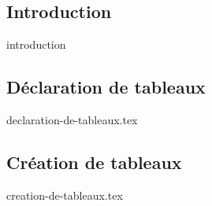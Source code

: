 \subsection{Introduction}\label{subsec:introduction}
{introduction}
\subsection{Déclaration de tableaux}\label{subsec:declaration-de-tableaux}
{declaration-de-tableaux.tex}
\subsection{Création de tableaux}\label{subsec:creation-de-tableaux}
{creation-de-tableaux.tex}
